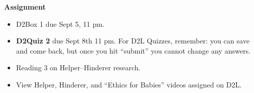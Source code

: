  {\bf Assignment}
 \begin{itemize}
 \item D2Box 1 due Sept 5,  11 pm.
 \item {\bf D2Quiz 2} due Sept 8th 11 pm. 
   For D2L Quizzes, remember: you can save and come
   back, but once you hit ``submit'' you cannot change any answers.
 \item Reading 3 on Helper--Hinderer research. 
 \item View Helper, Hinderer, and ``Ethics for Babies'' videos
   assigned on D2L.
 \end{itemize}

